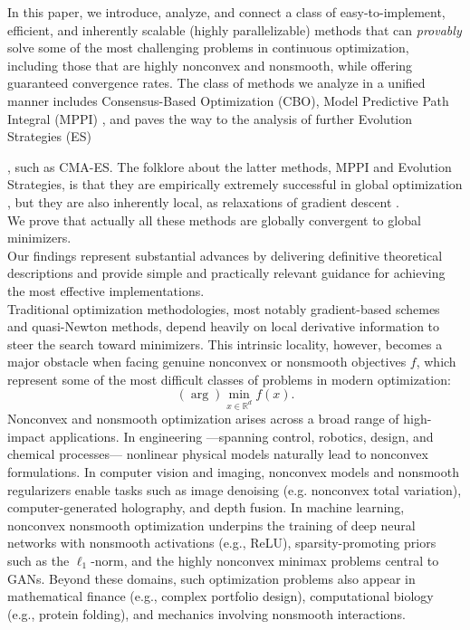 \documentclass[reqno]{amsart}
\numberwithin{algorithm}{section}
\begin{document}
In this paper, we introduce,  analyze, and connect a class of easy-to-implement, efficient, and inherently scalable (highly parallelizable) methods that can {\it provably} solve some of the most challenging problems in continuous optimization, including those that are highly nonconvex and nonsmooth, while offering guaranteed convergence rates. 
The class of methods we analyze in a unified manner includes Consensus-Based Optimization (CBO){\cite{pinnau2017consensus}}, Model Predictive Path Integral (MPPI) \cite{MPPI}, and paves the way to the analysis of further Evolution Strategies (ES){\cite{AugerHansen2005}, such as CMA-ES. The folklore about the latter methods, MPPI and Evolution Strategies, is that they are empirically extremely successful in global optimization \cite{COCO21}, but they are also inherently local, as relaxations of gradient descent \cite{Ollivier2017}.
\\
We prove that actually all these methods are globally convergent to global minimizers.
\\
Our findings represent  substantial advances by  delivering definitive theoretical descriptions and provide simple and practically relevant guidance for achieving the most effective implementations.
\\
Traditional optimization methodologies, most notably gradient-based schemes and quasi-Newton methods, depend heavily on local derivative information to steer the search toward minimizers. This intrinsic locality, however, becomes a major obstacle when facing genuine nonconvex or nonsmooth objectives $f$, which represent some of the most difficult classes of problems in modern optimization:
\begin{equation}\label{eq:globopt}
(\arg) \min_{x \in \mathbb R^d} f(x).
\end{equation}
{Nonconvex and nonsmooth optimization arises across a broad range of high-impact applications.  In engineering ---spanning control, robotics, design, and chemical processes--- nonlinear physical models naturally lead to nonconvex formulations. In computer vision and imaging, nonconvex models and nonsmooth regularizers enable tasks such as image denoising (e.g. nonconvex total variation), computer-generated holography, and depth fusion.
In machine learning, nonconvex nonsmooth optimization underpins the training of deep neural networks with nonsmooth activations (e.g., ReLU), sparsity-promoting priors such as the $\ell_1$-norm, and the highly nonconvex minimax problems central to GANs.
Beyond these domains, such optimization problems also appear in mathematical finance (e.g., complex portfolio design), computational biology (e.g., protein folding), and mechanics involving nonsmooth interactions.
}


}
\end{document}
